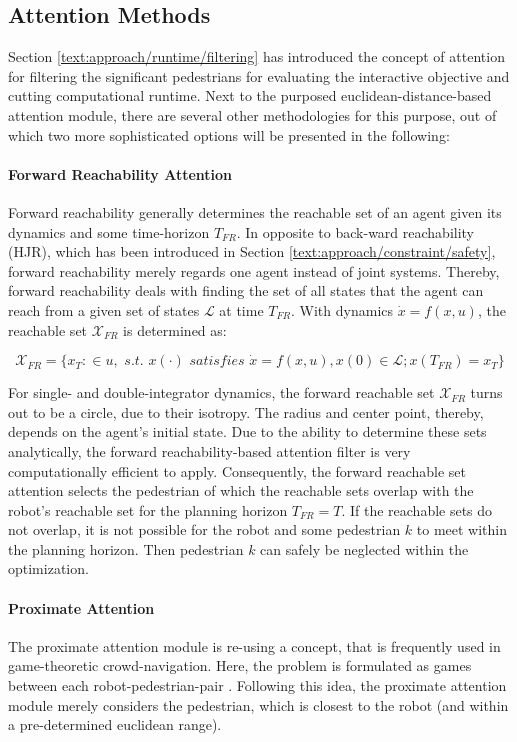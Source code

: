\subsection{Attention Methods}
Section \ref{text:approach/runtime/filtering} has introduced the concept of attention for filtering the significant pedestrians for evaluating the interactive objective and cutting computational runtime. Next to the purposed euclidean-distance-based attention module, there are several other methodologies for this purpose, out of which two more sophisticated options will be presented in the following:

\paragraph{Forward Reachability Attention}
Forward reachability generally determines the reachable set of an agent given its dynamics and some time-horizon $T_{FR}$. In opposite to back-ward reachability (\ac{HJR}), which has been introduced in Section \ref{text:approach/constraint/safety}, forward reachability merely regards one agent instead of joint systems. Thereby, forward reachability deals with finding the set of all states that the agent can reach from a given set of states $\mathcal{L}$ at time $T_{FR}$. With dynamics $\dot{x} = f(x, u)$, the reachable set $\mathcal{X}_{FR}$ is determined as:

\begin{equation}
\mathcal{X}_{FR} = \{x_T: \in u, \textit{ s.t. } x(\cdot) \textit{ satisfies } \dot{x} = f(x, u), x(0) \in \mathcal{L}; x(T_{FR}) = x_T\}
\end{equation}
 
For single- and double-integrator dynamics, the forward reachable set $\mathcal{X}_{FR}$ turns out to be a circle, due to their isotropy. The radius and center point, thereby, depends on the agent's initial state. Due to the ability to determine these sets analytically, the forward reachability-based attention filter is very computationally efficient to apply.
\newline
Consequently, the forward reachable set attention selects the pedestrian of which the reachable sets overlap with the robot's reachable set for the planning horizon $T_{FR} = T$. If the reachable sets do not overlap, it is not possible for the robot and some pedestrian $k$ to meet within the planning horizon. Then pedestrian $k$ can safely be neglected within the optimization.

\paragraph{Proximate Attention}
The proximate attention module is re-using a concept, that is frequently used in game-theoretic crowd-navigation. Here, the problem is formulated as games between each robot-pedestrian-pair \cite{Bouzat2014}\cite{Nikolaidis2017}. Following this idea, the proximate attention module merely considers the pedestrian, which is closest to the robot (and within a pre-determined euclidean range).

